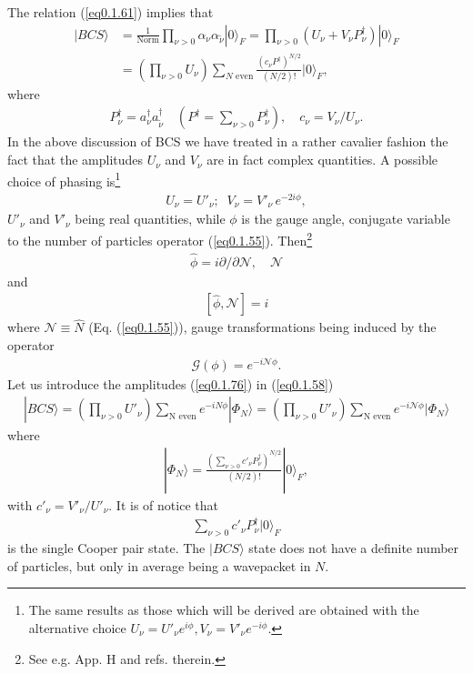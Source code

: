 \documentclass[a4paper,11pt]{book}
\numberwithin{equation}{section}
\numberwithin{figure}{section}
\numberwithin{table}{section}
\newcommand{\ket}[1]{|{#1} \rangle }
\begin{document}
 The relation (\ref{eq0.1.61}) implies that 
\begin{align}\label{eq0.1.74}
\nonumber \ket{BCS}&=\frac{1}{\text{Norm}}\prod_{\nu>0}\alpha_\nu\alpha_{\tilde\nu}\ket{0}_F=\prod_{\nu>0}\left(U_\nu+V_\nu P^\dagger_\nu\right)\ket{0}_F\\&=\left(\prod_{\nu>0}U_{\nu}\right)\sum_{N\text{ even}} \frac{\left(c_\nu P^\dagger\right)^{N/2}}{(N/2)!}\ket{0}_F,
\end{align}
 where
\begin{align}\label{eq0.1.75}
P^\dagger_\nu=a_\nu^\dagger a^\dagger_{\tilde \nu}\quad \left(P^\dagger=\sum_{\nu>0}P^\dagger_\nu\right), \quad c_\nu=V_\nu/U_\nu.
\end{align}
 In the above discussion of BCS we have treated in a rather cavalier fashion the fact that the amplitudes $U_\nu$ and $V_\nu$ are in fact complex quantities. A possible choice of phasing is\footnote{The same results as those which will be derived are obtained with the alternative choice $U_\nu=U'_\nu e^{i\phi},V_\nu=V'_\nu e^{-i\phi}$.} 
\begin{align}\label{eq0.1.76}
U_\nu=U'_\nu;\;\;V_\nu=V'_\nu\, e^{-2i\phi},
\end{align}
$U'_\nu$ and $V'_\nu$ being real quantities, while $\phi$ is the gauge angle, conjugate variable to the number of particles operator (\ref{eq0.1.55}). Then\footnote{See e.g. \cite{Brink:05} App. H and refs. therein.}
\begin{align}\label{eq0.1.77}
\hat\phi=i\partial/\partial \mathcal N,\quad \mathcal N
\end{align}
and
\begin{align}\label{eq0.1.78}
\left[\hat \phi,\mathcal N\right]=i
\end{align}
where $\mathcal N\equiv\hat N$ (Eq. (\ref{eq0.1.55})), gauge transformations being induced by the operator 
\begin{align}\label{eq0.1.79}
\mathcal G(\phi)=e^{-i\mathcal N\phi}.
\end{align}
Let us introduce the amplitudes (\ref{eq0.1.76}) in (\ref{eq0.1.58})
\begin{align}\label{eq0.1.80}
\ket{BCS}=\left(\prod_{\nu>0}U'_\nu\right)\sum_{\text{N even}}e^{-iN\phi}\ket{\Phi_{N}}=\left(\prod_{\nu>0}U'_\nu\right)\sum_{\text{N even}}e^{-i\mathcal N\phi}\ket{\Phi_{N}}
\end{align}
where
\begin{align}\label{eq0.1.81}
\ket{\Phi_{N}}=\frac{\left(\sum_{\nu>0}c'_\nu P^\dagger_\nu\right)^{N/2}}{\left(N/2\right)!}\ket{0}_F,
\end{align}
with $c'_\nu=V'_\nu/U'_\nu$. It is of notice that
\begin{align}\label{eq0.1.82}
\sum_{\nu>0}c'_\nu P^\dagger_\nu\ket{0}_F
\end{align}
is the single Cooper pair state.  The  $\ket{BCS}$ state does not have a definite number of particles, but only in average being a wavepacket in $N$. 
\end{document}
